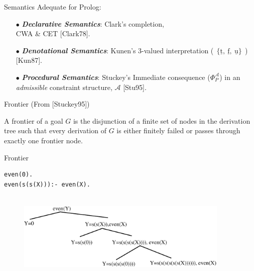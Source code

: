 \documentclass[pdf,slideColor,contemporain]{prosper}
\newcommand{\true}{\underline{\mathrm{t}}}
\newcommand{\false}{\underline{\mathrm{f}}}
\newcommand{\undef}{\underline{\mathrm{u}}}
\begin{document}
\begin{slide}{Semantics}
  \vspace{0.5cm}
Adequate for Prolog:
\begin{itemize} 

     \item[{\blue $\bullet$}] \emph{\bf Declarative Semantics}: {\blue
      Clark}'s completion, \\ CWA \& CET [Clark78].

     \item[{\blue $\bullet$}] \emph{\bf Denotational Semantics}:
     {\blue Kunen}'s 3-valued interpretation ($~~\{\true, ~ \false,~
     \undef \}~~$) [Kun87].
 
     \item[{\blue $\bullet$}] \emph{\bf Procedural Semantics}: {\blue
     Stuckey}'s Immediate consequence ($\Phi_P^\mathcal{A}$) in an
     \emph{admissible} constraint structure, $\mathcal{A}$ [Stu95].



\end{itemize}
\end{slide}

\begin{slide}{Frontier}
\vspace{1cm}
(From [Stuckey95])

A {\blue frontier} of a goal $G$ is the {\blue disjunction} of a finite set of {\blue nodes} in the
derivation tree such that every derivation of $G$ is either finitely failed or
passes through exactly one frontier node.

\end{slide}

\begin{slide}{Frontier}
\begin{tiny}
{\blue
 \begin{verbatim}
even(0).
even(s(s(X))):- even(X).


 \end{verbatim}
}
\end{tiny}

\begin{figure}
        \centering
        \includegraphics[width=4in]{frontier0.eps} 
\end{figure}
\end{slide}
\end{document}
